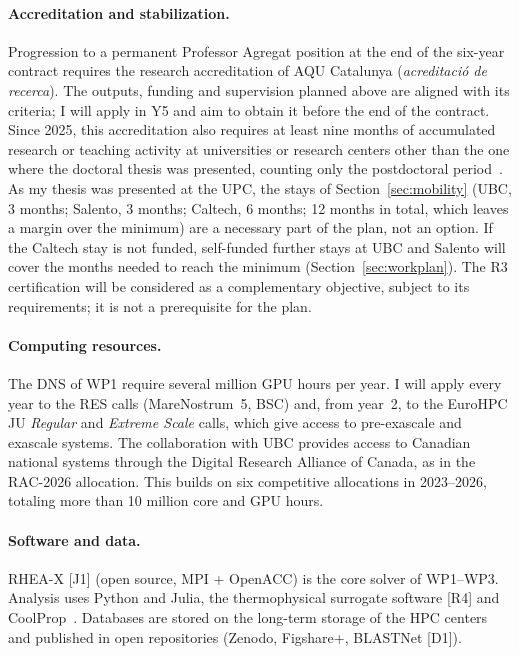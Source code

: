 \documentclass[11pt]{article}
\begin{document}
\paragraph{Accreditation and stabilization.} Progression to a permanent Professor Agregat
position at the end of the six-year contract requires the research accreditation of AQU
Catalunya (\emph{acreditaci\'o de recerca}). The outputs, funding and supervision planned
above are aligned with its criteria; I will apply in Y5 and aim to obtain it before the end
of the contract. Since 2025, this accreditation also requires at least nine months of
accumulated research or teaching activity at universities or research centers other than the
one where the doctoral thesis was presented, counting only the postdoctoral
period~\cite{AQU2025}. As my thesis was presented at the UPC, the stays of
Section~\ref{sec:mobility} (UBC, 3 months; Salento, 3 months; Caltech, 6 months;
12 months in total, which leaves a margin over the minimum) are a necessary part of the plan, not an option. If the Caltech stay is not funded, self-funded further
stays at UBC and Salento will cover the months needed to reach the minimum (Section~\ref{sec:workplan}). The R3 certification will be considered as a complementary objective, subject
to its requirements; it is not a prerequisite for the plan.

\paragraph{Computing resources.} The DNS of WP1 require several million GPU hours per year. I will apply every year to the RES calls (MareNostrum~5, BSC) and, from year~2, to
the EuroHPC JU \emph{Regular} and \emph{Extreme Scale} calls, which give access to
pre-exascale and exascale systems. The collaboration with UBC provides access to Canadian
national systems through the Digital Research Alliance of Canada, as in the RAC-2026
allocation. This builds on six competitive allocations in 2023--2026, totaling more than 10
million core and GPU hours.

\paragraph{Software and data.} RHEA-X [J1] (open source, MPI + OpenACC) is the core solver of
WP1--WP3. Analysis uses Python and Julia, the thermophysical surrogate software [R4] and
CoolProp~\cite{CoolProp2014}. Databases are stored on the long-term storage of the HPC centers
and published in open repositories (Zenodo, Figshare+, BLASTNet [D1]).
\end{document}
